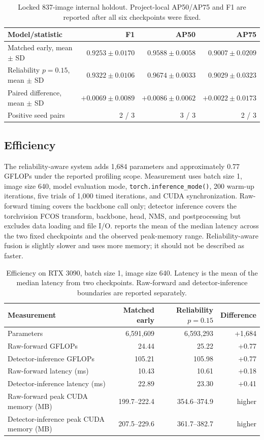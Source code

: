 
\begin{table}[t]
\centering
\caption{Locked 837-image internal holdout. Project-local AP50/AP75 and F1 are reported after all six checkpoints were fixed.}
\label{tab:guard}
\small
\begin{tabular}{@{}lrrr@{}}
\toprule
Model/statistic & F1 & AP50 & AP75\\
\midrule
Matched early, mean $\pm$ SD & $0.9253\pm0.0170$ & $0.9588\pm0.0058$ & $0.9007\pm0.0209$\\
Reliability $p=0.15$, mean $\pm$ SD & $0.9322\pm0.0106$ & $0.9674\pm0.0033$ & $0.9029\pm0.0323$\\
Paired difference, mean $\pm$ SD & $+0.0069\pm0.0089$ & $+0.0086\pm0.0062$ & $+0.0022\pm0.0173$\\
Positive seed pairs & 2 / 3 & 3 / 3 & 2 / 3\\
\bottomrule
\end{tabular}
\end{table}

\subsection{Efficiency}
The reliability-aware system adds 1,684 parameters and approximately 0.77 GFLOPs under the reported profiling scope. Measurement uses batch size 1, image size 640, model evaluation mode, \texttt{torch.inference\_mode()}, 200 warm-up iterations, five trials of 1,000 timed iterations, and CUDA synchronization. Raw-forward timing covers the backbone call only; detector inference covers the torchvision FCOS transform, backbone, head, NMS, and postprocessing but excludes data loading and file I/O.  reports the mean of the median latency across the two fixed checkpoints and the observed peak-memory range. Reliability-aware fusion is slightly slower and uses more memory; it should not be described as faster.

\begin{table}[t]
\centering
\caption{Efficiency on RTX 3090, batch size 1, image size 640. Latency is the mean of the median latency from two checkpoints. Raw-forward and detector-inference boundaries are reported separately.}
\label{tab:efficiency}
\small
\begin{tabular}{@{}lrrr@{}}
\toprule
Measurement & Matched early & Reliability $p=0.15$ & Difference\\
\midrule
Parameters & 6,591,609 & 6,593,293 & +1,684\\
Raw-forward GFLOPs & 24.44 & 25.22 & +0.77\\
Detector-inference GFLOPs & 105.21 & 105.98 & +0.77\\
Raw-forward latency (ms) & 10.43 & 10.61 & +0.18\\
Detector-inference latency (ms) & 22.89 & 23.30 & +0.41\\
Raw-forward peak CUDA memory (MB) & 199.7--222.4 & 354.6--374.9 & higher\\
Detector-inference peak CUDA memory (MB) & 207.5--229.6 & 361.7--382.7 & higher\\
\bottomrule
\end{tabular}
\end{table}


